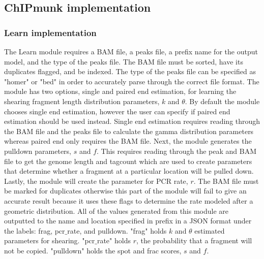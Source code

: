 \documentclass[12pt]{article}
\begin{document}
\subsection*{ChIPmunk implementation}

\subsubsection*{Learn implementation}
The Learn module requires a BAM file, a peaks file, a prefix name for the output model, and the type of the peaks file.
The BAM file must be sorted, have its duplicates flagged, and be indexed.
The type of the peaks file can be specified as "homer" or "bed" in order to accurately parse through the correct file format.
The module has two options, single and paired end estimation, for learning the shearing fragment length distribution parameters, $k$ and $\theta$.
By default the module chooses single end estimation, however the user can specify if paired end estimation should be used instead.
Single end estimation requires reading through the BAM file and the peaks file to calculate the gamma distribution parameters whereas paired end only requires the BAM file.
Next, the module generates the pulldown parameters, $s$ and $f$.
This requires reading through the peak and BAM file to get the genome length and tagcount which are used to create parameters that determine whether a fragment at a particular location will be pulled down. 
Lastly, the module will create the parameter for PCR rate, $r$. 
The BAM file must be marked for duplicates otherwise this part of the module will fail to give an accurate result because it uses these flags to determine the rate modeled after a geometric distribution.
All of the values generated from this module are outputted to the name and location specified in prefix in a JSON format under the labels: frag, pcr$\_$rate, and pulldown.
"frag" holds $k$ and $\theta$ estimated parameters for shearing.
"pcr$\_$rate" holds $r$, the probability that a fragment will not be copied.
"pulldown" holds the spot and frac scores, $s$ and $f$.
\end{document}
